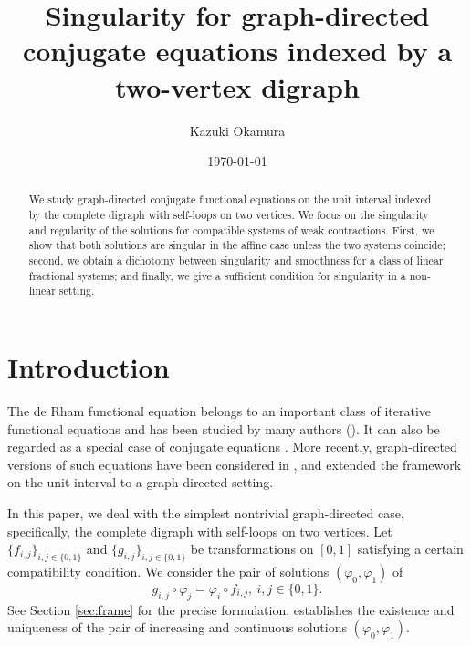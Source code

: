 \documentclass[a4paper, reqno, 11pt]{amsart}
\theoremstyle{definition}
\begin{document}
\begin{abstract}
We study graph-directed conjugate functional equations on the unit interval indexed by the complete digraph with self-loops on two vertices. 
We focus on the singularity and regularity of the solutions for compatible systems of weak contractions. 
First, we show that both solutions are singular in the affine case unless the two systems coincide; second, we obtain a dichotomy between singularity and smoothness for a class of linear fractional systems; and finally, we give a sufficient condition for singularity in a non-linear setting.
\end{abstract}



\title[]{Singularity for graph-directed conjugate equations indexed by a two-vertex digraph}
\author{Kazuki Okamura}
\date{\today}
\address{Department of Mathematics, Faculty of Science, Shizuoka University, 836, Ohya, Suruga-ku, Shizuoka, 422-8529, JAPAN.}
\maketitle


\section{Introduction}\label{sec:intro}


The de Rham functional equation belongs to an important class of iterative functional equations and has been studied by many authors (\cite{Barany2018, Berg2000, BuescuSerpa2021, Girgensohn2006, Hata1985K, Hata1985, Kawaharada2025, Kawamura2002, Serpa2015, Serpa2015N, Serpa2017, Zdun2001}).   
It can also be regarded as a special case of conjugate equations \cite{BuescuSerpa2021, Okamura2019}. 
More recently, graph-directed versions of such equations have been considered in \cite{MuramotoSekiguchi2020}, and \cite[Section 5]{Okamura2025} extended the framework on the unit interval to a graph-directed setting. 


In this paper, we deal with the simplest nontrivial graph-directed case, specifically, the complete digraph with self-loops on two vertices. 
Let $\{f_{i,j}\}_{i,j \in \{0,1\}}$ and $\{g_{i,j}\}_{i,j \in \{0,1\}}$ be transformations on $[0,1]$ satisfying a certain compatibility condition. 
We consider the pair of solutions $(\varphi_0, \varphi_1)$ of 
\begin{equation}\label{eq:conjugate-1st} 
g_{i,j} \circ \varphi_j = \varphi_{i} \circ f_{i,j}, \ i, j \in \{0,1\}. 
\end{equation}
See Section \ref{sec:frame} for the precise formulation. 
\cite[Section 5]{Okamura2025} establishes the existence and uniqueness of the pair of increasing and continuous solutions $(\varphi_0, \varphi_1)$. 
\end{document}
